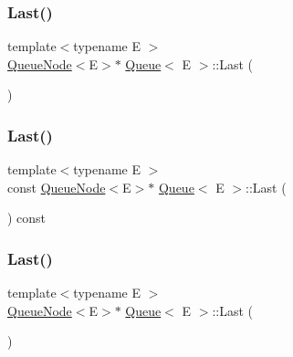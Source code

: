 \mbox{\label{class_queue_a430aca3d3b9f5fd588b215028d134b74}} 
\subsubsection{\texorpdfstring{Last()}{Last()}\hspace{0.1cm}{\footnotesize\ttfamily [1/6]}}
{\footnotesize\ttfamily template$<$typename E $>$ \\
\mbox{\hyperlink{class_queue_node}{Queue\+Node}}$<$E$>$$\ast$ \mbox{\hyperlink{class_queue}{Queue}}$<$ E $>$\+::Last (\begin{DoxyParamCaption}{ }\end{DoxyParamCaption})\hspace{0.3cm}{\ttfamily [inline]}}

\mbox{\label{class_queue_a7c8c2c64700dfe1df8bf266572cf101a}} 
\subsubsection{\texorpdfstring{Last()}{Last()}\hspace{0.1cm}{\footnotesize\ttfamily [2/6]}}
{\footnotesize\ttfamily template$<$typename E $>$ \\
const \mbox{\hyperlink{class_queue_node}{Queue\+Node}}$<$E$>$$\ast$ \mbox{\hyperlink{class_queue}{Queue}}$<$ E $>$\+::Last (\begin{DoxyParamCaption}{ }\end{DoxyParamCaption}) const\hspace{0.3cm}{\ttfamily [inline]}}

\mbox{\label{class_queue_a430aca3d3b9f5fd588b215028d134b74}} 
\subsubsection{\texorpdfstring{Last()}{Last()}\hspace{0.1cm}{\footnotesize\ttfamily [3/6]}}
{\footnotesize\ttfamily template$<$typename E $>$ \\
\mbox{\hyperlink{class_queue_node}{Queue\+Node}}$<$E$>$$\ast$ \mbox{\hyperlink{class_queue}{Queue}}$<$ E $>$\+::Last (\begin{DoxyParamCaption}{ }\end{DoxyParamCaption})\hspace{0.3cm}{\ttfamily [inline]}}

